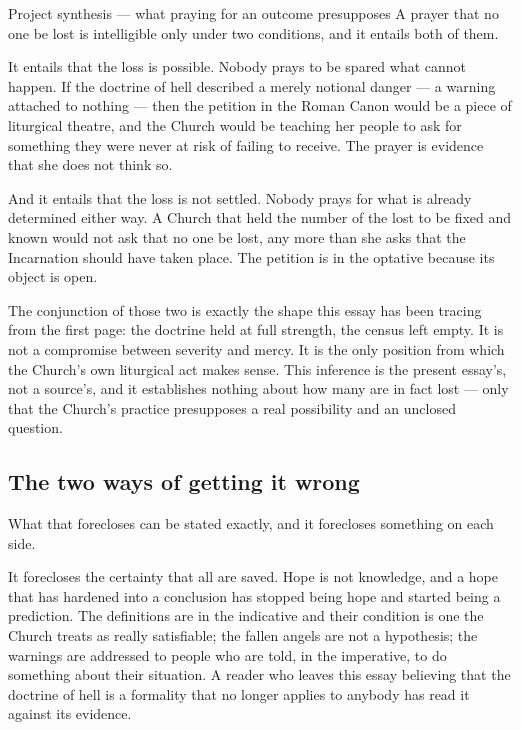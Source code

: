 \begin{studybox}{Project synthesis --- what praying for an outcome presupposes}
\setlength{\parskip}{0.5em}
A prayer that no one be lost is intelligible only under two conditions, and it entails both of them.

It entails that the loss is possible. Nobody prays to be spared what cannot happen. If the doctrine of hell described a merely notional danger --- a warning attached to nothing --- then the petition in the Roman Canon would be a piece of liturgical theatre, and the Church would be teaching her people to ask for something they were never at risk of failing to receive. The prayer is evidence that she does not think so.

And it entails that the loss is not settled. Nobody prays for what is already determined either way. A Church that held the number of the lost to be fixed and known would not ask that no one be lost, any more than she asks that the Incarnation should have taken place. The petition is in the optative because its object is open.

The conjunction of those two is exactly the shape this essay has been tracing from the first page: the doctrine held at full strength, the census left empty. It is not a compromise between severity and mercy. It is the only position from which the Church's own liturgical act makes sense. This inference is the present essay's, not a source's, and it establishes nothing about how many are in fact lost --- only that the Church's practice presupposes a real possibility and an unclosed question.
\end{studybox}

\subsection{The two ways of getting it wrong}

What that forecloses can be stated exactly, and it forecloses something on each side.

It forecloses the certainty that all are saved. Hope is not knowledge, and a hope that has hardened into a conclusion has stopped being hope and started being a prediction. The definitions are in the indicative and their condition is one the Church treats as really satisfiable; the fallen angels are not a hypothesis; the warnings are addressed to people who are told, in the imperative, to do something about their situation. A reader who leaves this essay believing that the doctrine of hell is a formality that no longer applies to anybody has read it against its evidence.

